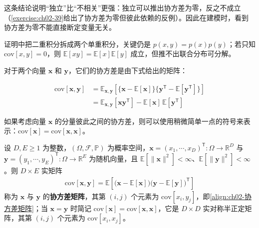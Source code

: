 \documentclass[../../main.tex]{subfiles}
\begin{document}
\begin{remark}
这条结论说明“独立”比“不相关”更强：独立可以推出协方差为零，反之不成立（\cref{exercise:ch02-39}给出了协方差为零但彼此依赖的反例）。因此在建模时，看到协方差为零不能直接断定变量无关。

证明中把二重积分拆成两个单重积分，关键仍是 $p(x,y)=p(x)p(y)$；若只知 $\mathrm{cov}[x,y]=0$，则 $\mathbb{E}[xy]=\mathbb{E}[x]\mathbb{E}[y]$ 成立，但推不出联合分布可分解。
\end{remark}

对于两个向量 $\mathbf{x}$ 和 $\mathbf{y}$，它们的协方差是由下式给出的矩阵：

\begin{align}
  \mathrm{cov}[\mathbf{x},\mathbf{y}] &= \mathbb{E}_{\mathbf{x},\mathbf{y}}\left[\big\{\mathbf{x}-\mathbb{E}[\mathbf{x}]\big\}\big\{\mathbf{y}^{\mathsf{T}}-\mathbb{E}[\mathbf{y}^{\mathsf{T}}]\big\}\right] \nonumber \\
  &= \mathbb{E}_{\mathbf{x},\mathbf{y}}\left[\mathbf{x}\mathbf{y}^{\mathsf{T}}\right] - \mathbb{E}[\mathbf{x}]\,\mathbb{E}[\mathbf{y}^{\mathsf{T}}]
  \label{align:ch02-协方差矩阵}
\end{align}

如果考虑向量 $\mathbf{x}$ 的分量彼此之间的协方差，则可以使用稍微简单一点的符号来表示：$\mathrm{cov}[\mathbf{x}]=\mathrm{cov}[\mathbf{x},\mathbf{x}]$。

\begin{definition}[协方差矩阵]\label{definition:ch02-协方差矩阵}
设 $D,E\geqslant1$ 为整数，$(\Omega,\mathcal{F},\mathbb{P})$ 为概率空间，$\mathbf{x}=(x_1,\cdots,x_D)^{\mathsf{T}}:\Omega\to\mathbb{R}^{D}$ 与 $\mathbf{y}=(y_1,\cdots,y_E)^{\mathsf{T}}:\Omega\to\mathbb{R}^{E}$ 为随机向量，且 $\mathbb{E}[\|\mathbf{x}\|^{2}]<\infty$、$\mathbb{E}[\|\mathbf{y}\|^{2}]<\infty$。则 $D\times E$ 实矩阵
\begin{align*}
  \mathrm{cov}[\mathbf{x},\mathbf{y}]=\mathbb{E}\left[\big(\mathbf{x}-\mathbb{E}[\mathbf{x}]\big)\big(\mathbf{y}-\mathbb{E}[\mathbf{y}]\big)^{\mathsf{T}}\right]
\end{align*}
称为 $\mathbf{x}$ 与 $\mathbf{y}$ 的\textbf{协方差矩阵}，其第 $(i,j)$ 个元素为 $\mathrm{cov}[x_i,y_j]$，即\eqref{align:ch02-协方差矩阵}；当 $\mathbf{x}=\mathbf{y}$ 时简记 $\mathrm{cov}[\mathbf{x}]=\mathrm{cov}[\mathbf{x},\mathbf{x}]$，它是 $D\times D$ 实对称半正定矩阵，其第 $(i,j)$ 个元素为 $\mathrm{cov}[x_i,x_j]$。
\end{definition}
\end{document}
